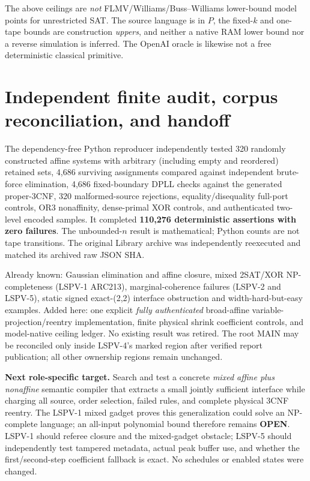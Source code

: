 \documentclass[11pt]{article}
\begin{document}
The above ceilings are \emph{not} FLMV/Williams/Buss--Williams lower-bound model points for unrestricted SAT. The source language is in $P$, the fixed-$k$ and one-tape bounds are construction \emph{uppers}, and neither a native RAM lower bound nor a reverse simulation is inferred. The OpenAI oracle is likewise not a free deterministic classical primitive.

\section{Independent finite audit, corpus reconciliation, and handoff}
The dependency-free Python reproducer independently tested 320 randomly constructed affine systems with arbitrary (including empty and reordered) retained sets, 4,686 surviving assignments compared against independent brute-force elimination, 4,686 fixed-boundary DPLL checks against the generated proper-3CNF, 320 malformed-source rejections, equality/disequality full-port controls, OR3 nonaffinity, dense-primal XOR controls, and authenticated two-level encoded samples. It completed \textbf{110,276 deterministic assertions with zero failures}. The unbounded-$n$ result is mathematical; Python counts are not tape transitions. The original Library archive was independently reexecuted and matched its archived raw JSON SHA.

Already known: Gaussian elimination and affine closure, mixed 2SAT/XOR NP-completeness (LSPV-1 ARC213), marginal-coherence failures (LSPV-2 and LSPV-5), static signed exact-(2,2) interface obstruction and width-hard-but-easy examples. Added here: one explicit \emph{fully authenticated} broad-affine variable-projection/reentry implementation, finite physical shrink coefficient controls, and model-native ceiling ledger. No existing result was retired. The root MAIN may be reconciled only inside LSPV-4's marked region after verified report publication; all other ownership regions remain unchanged.

\noindent\textbf{Next role-specific target.} Search and test a concrete \emph{mixed affine plus nonaffine} semantic compiler that extracts a small jointly sufficient interface while charging all source, order selection, failed rules, and complete physical 3CNF reentry. The LSPV-1 mixed gadget proves this generalization could solve an NP-complete language; an all-input polynomial bound therefore remains \textbf{OPEN}. LSPV-1 should referee closure and the mixed-gadget obstacle; LSPV-5 should independently test tampered metadata, actual peak buffer use, and whether the first/second-step coefficient fallback is exact. No schedules or enabled states were changed.
\end{document}
